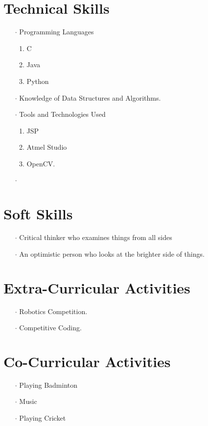 \documentclass[12pt]{article}
\begin{document}
\section*{Technical Skills}
\begin{itemize}
\item[$\cdot$]Programming Languages
\begin{enumerate}
\item C
\item Java
\item Python
\end{enumerate}
\item[$\cdot$]Knowledge of Data Structures and Algorithms.
\item[$\cdot$]Tools and Technologies Used
\begin{enumerate}
\item JSP
\item Atmel Studio
\item OpenCV.
\end{enumerate}
\end{itemize}
\begin{itemize}
\item[$\cdot$]
\end{itemize}
\section*{Soft Skills}
\begin{itemize}
\item[$\cdot$] Critical thinker who examines things from all sides
\item[$\cdot$]An optimistic person who looks at the brighter side of things.
\end{itemize}
\section*{Extra-Curricular Activities}
\begin{itemize}
\item[$\cdot$]Robotics Competition.
\item[$\cdot$]Competitive Coding.
\end{itemize}
\section*{Co-Curricular Activities}
\begin{itemize}
\item[$\cdot$] Playing Badminton
\item[$\cdot$] Music
\item[$\cdot$] Playing Cricket 
\end{itemize}
\end{document}
